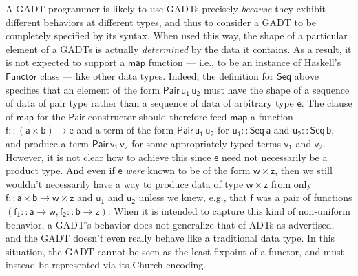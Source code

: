 \documentclass[acmsmall,screen,review,anonymous]{acmart}
\theoremstyle{definition}
\begin{document}
A GADT programmer is likely to use GADTs precisely {\em because} they
exhibit different behaviors at different types, and thus to consider a
GADT to be completely specified by its syntax. When used this way, the
shape of a particular element of a GADTs is actually {\em determined}
by the data it contains. As a result, it is not expected to support a
$\mathsf{map}$ function --- i.e., to be an instance of Haskell's
$\mathsf{Functor}$ class --- like other data types. Indeed, the
definition for $\mathsf{Seq}$ above specifies that an element of the
form $\mathsf{Pair\,u_1\,u_2}$ must have the shape of a sequence of
data of pair type rather than a sequence of data of arbitrary type
$\mathsf{e}$.  The clause of $\mathsf{map}$ for the $\mathsf{Pair}$
constructor should therefore feed $\mathsf{map}$ a function $\mathsf{f
  :: (a \times b) \to e}$ and a term of the form $\mathsf{Pair
  \,u_1\,u_2}$ for $\mathsf{u_1 :: Seq\,a}$ and $\mathsf{u_2 ::
  Seq\,b}$, and produce a term $\mathsf{Pair\,v_1\,v_2}$ for some
appropriately typed terms $\mathsf{v_1}$ and $\mathsf{v_2}$. However,
it is not clear how to achieve this since $\mathsf{e}$ need not
necessarily be a product type. And even if $\mathsf{e}$ {\em were}
known to be of the form $\mathsf{w \times z}$, then we still wouldn't
necessarily have a way to produce data of type $\mathsf{w \times z}$
from only $\mathsf{f :: a \times b \to w \times z}$ and $\mathsf{u_1}$
and $\mathsf{u_2}$ unless we knew, e.g., that $\mathsf{f}$ was a pair
of functions $\mathsf{(f_1 :: a \to w, f_2 :: b \to z)}$. When it is
intended to capture this kind of non-uniform behavior, a GADT's
behavior does not generalize that of ADTs as advertised, and the GADT
doesn't even really behave like a traditional data type. In this
situation, the GADT cannot be seen as the least fixpoint of a functor,
and must instead be represented via its Church encoding.
\end{document}
